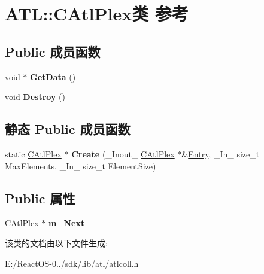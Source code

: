 \hypertarget{class_a_t_l_1_1_c_atl_plex}{}\section{A\+TL\+:\+:C\+Atl\+Plex类 参考}
\label{class_a_t_l_1_1_c_atl_plex}
\subsection*{Public 成员函数}
\begin{DoxyCompactItemize}
\item 
\mbox{\label{class_a_t_l_1_1_c_atl_plex_a6462341552e4aa8f7fbcd43169981b25}} 
\hyperlink{interfacevoid}{void} $\ast$ {\bfseries Get\+Data} ()
\item 
\mbox{\label{class_a_t_l_1_1_c_atl_plex_afb98a812a40ed78cfc57f859b699d759}} 
\hyperlink{interfacevoid}{void} {\bfseries Destroy} ()
\end{DoxyCompactItemize}
\subsection*{静态 Public 成员函数}
\begin{DoxyCompactItemize}
\item 
\mbox{\label{class_a_t_l_1_1_c_atl_plex_af4cf0c29106f3d9c91b2c703cc4b5107}} 
static \hyperlink{class_a_t_l_1_1_c_atl_plex}{C\+Atl\+Plex} $\ast$ {\bfseries Create} (\+\_\+\+Inout\+\_\+ \hyperlink{class_a_t_l_1_1_c_atl_plex}{C\+Atl\+Plex} $\ast$\&\hyperlink{struct_entry}{Entry}, \+\_\+\+In\+\_\+ size\+\_\+t Max\+Elements, \+\_\+\+In\+\_\+ size\+\_\+t Element\+Size)
\end{DoxyCompactItemize}
\subsection*{Public 属性}
\begin{DoxyCompactItemize}
\item 
\mbox{\label{class_a_t_l_1_1_c_atl_plex_afc90c692aa52c6238fd76fbf218f631d}} 
\hyperlink{class_a_t_l_1_1_c_atl_plex}{C\+Atl\+Plex} $\ast$ {\bfseries m\+\_\+\+Next}
\end{DoxyCompactItemize}


该类的文档由以下文件生成\+:\begin{DoxyCompactItemize}
\item 
E\+:/\+React\+O\+S-\/0../sdk/lib/atl/atlcoll.\+h\end{DoxyCompactItemize}
